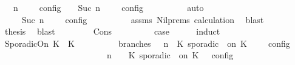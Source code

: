 \begin{isabellebody}
\ {\isacartoucheopen}{\isasymlbrakk}\ {\isasymGamma}{\isacharcomma}\ n\ {\isasymturnstile}\ {\isacharbrackleft}{\isacharbrackright}\ {\isasymtriangleright}\ {\isasymPhi}\ {\isasymrbrakk}\isactrlsub c\isactrlsub o\isactrlsub n\isactrlsub f\isactrlsub i\isactrlsub g\ {\isacharequal}\ {\isasymlbrakk}\ {\isasymGamma}{\isacharcomma}\ Suc\ n\ {\isasymturnstile}\ {\isasymPhi}\ {\isasymtriangleright}\ {\isacharbrackleft}{\isacharbrackright}\ {\isasymrbrakk}\isactrlsub c\isactrlsub o\isactrlsub n\isactrlsub f\isactrlsub i\isactrlsub g{\isacartoucheclose}\isanewline
\ \ \ \ \ \ \ \ \isamarkupfalse%
\ auto\isanewline
\ \ \ \ \ \ \isamarkupfalse%
\ \isamarkupfalse%
\ {\isacartoucheopen}{\isasymrho}\ {\isasymin}\ {\isasymlbrakk}\ {\isasymGamma}{\isacharcomma}\ Suc\ n\ {\isasymturnstile}\ {\isasymPhi}\ {\isasymtriangleright}\ {\isacharbrackleft}{\isacharbrackright}\ {\isasymrbrakk}\isactrlsub c\isactrlsub o\isactrlsub n\isactrlsub f\isactrlsub i\isactrlsub g{\isacartoucheclose}\isanewline
\ \ \ \ \ \ \ \ \isamarkupfalse%
\ assms\ Nil{\isachardot}prems\ calculation{\isacharparenleft}{}{\isacharparenright}\ \isamarkupfalse%
\ blast\isanewline
\ \ \ \ \ \ \isamarkupfalse%
\ \isamarkupfalse%
\ {\isacharquery}thesis\ \isamarkupfalse%
\ blast\isanewline
\ \ \ \ \isamarkupfalse%
\isanewline
{}\isamarkupfalse%
\isanewline
\ \ \isamarkupfalse%
\ {\isacharparenleft}Cons\ {\isasympsi}\ {\isasymPsi}{\isacharparenright}\isanewline
\ \ \ \ \isamarkupfalse%
\ \isamarkupfalse%
\ {\isacharquery}case\isanewline
\ \ \ \ \isamarkupfalse%
\ {\isacharparenleft}induct\ {\isasympsi}{\isacharparenright}\isanewline
\ \ \ \ \ \ \isamarkupfalse%
\ {\isacharparenleft}SporadicOn\ K\ {\isasymtau}\ K\isanewline
\ \ \ \ \ \ \ \ \isamarkupfalse%
\ branches{\isacharcolon}\ {\isacartoucheopen}{\isasymlbrakk}\ {\isasymGamma}{\isacharcomma}\ n\ {\isasymturnstile}\ {\isacharparenleft}{\isacharparenleft}K\ sporadic\ {\isasymtau}\ on\ K\ {\isacharhash}\ {\isasymPsi}{\isacharparenright}\ {\isasymtriangleright}\ {\isasymPhi}\ {\isasymrbrakk}\isactrlsub c\isactrlsub o\isactrlsub n\isactrlsub f\isactrlsub i\isactrlsub g\isanewline
\ \ \ \ \ \ \ \ \ \ \ \ \ \ \ \ \ \ \ \ \ \ {\isacharequal}\ {\isasymlbrakk}\ {\isasymGamma}{\isacharcomma}\ n\ {\isasymturnstile}\ {\isasymPsi}\ {\isasymtriangleright}\ {\isacharparenleft}{\isacharparenleft}K\ sporadic\ {\isasymtau}\ on\ K\ {\isacharhash}\ {\isasymPhi}{\isacharparenright}\ {\isasymrbrakk}\isactrlsub c\isactrlsub o\isactrlsub n\isactrlsub f\isactrlsub i\isactrlsub g\isanewline

\end{isabellebody}
